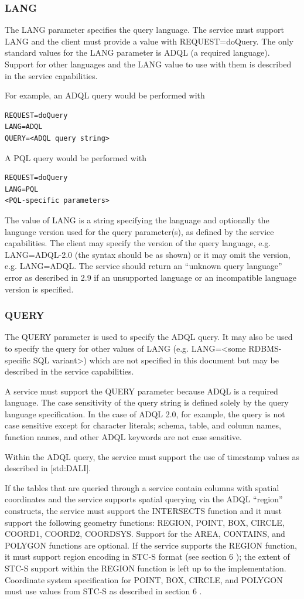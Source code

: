 \documentclass[11pt,a4paper]{ivoa}
\begin{document}
\subsubsection{LANG}
The LANG parameter specifies the query language. The service must support LANG 
and the client must provide a value with REQUEST=doQuery. The only standard 
values for the LANG parameter is ADQL (a required language). Support for other 
languages and the LANG value to use with them is described in the service 
capabilities.

For example, an ADQL query would be performed with
\begin{verbatim}
REQUEST=doQuery
LANG=ADQL
QUERY=<ADQL query string>
\end{verbatim}
A PQL query would be performed with
\begin{verbatim}
REQUEST=doQuery
LANG=PQL
<PQL-specific parameters>
\end{verbatim}
The value of LANG is a string specifying the language and optionally the 
language version used for the query parameter(s), as defined by the service 
capabilities.  The client may specify the version of the query language,  e.g. 
LANG=ADQL-2.0 (the syntax should be as shown) or it may omit the version, e.g. 
LANG=ADQL.  The service should return an “unknown query language” error as 
described in 2.9 if an unsupported language or an incompatible language version 
is specified.

\subsubsection{QUERY}
The QUERY parameter is used to specify the ADQL query. It may also be used to 
specify the query for other values of LANG (e.g. LANG=<some RDBMS-specific SQL 
variant>) which are not specified in this document but may be described in the 
service capabilities.

A service must support the QUERY parameter because ADQL is a required language.  
The case sensitivity of the query string is defined solely by the query language 
specification. In the case of ADQL 2.0, for example, the query is not case 
sensitive except for character  literals; schema, table, and column names, 
function names, and other ADQL keywords are not case sensitive.

Within the ADQL query, the service must support the use of timestamp values as 
described in [std:DALI].

If the tables that are queried through a service contain columns with spatial 
coordinates and the service supports spatial querying via the ADQL “region” 
constructs, the service must support the INTERSECTS function and it must support 
the following geometry functions: REGION, POINT, BOX, CIRCLE, COORD1, COORD2, 
COORDSYS. Support for the AREA, CONTAINS, and POLYGON functions are optional. If 
the service supports the REGION function, it must support region encoding in 
STC-S format (see section 6 ); the extent of STC-S support within the REGION 
function is left up to the implementation. Coordinate system specification for 
POINT, BOX, CIRCLE, and POLYGON must use values from STC-S as described in 
section 6 .
\end{document}
